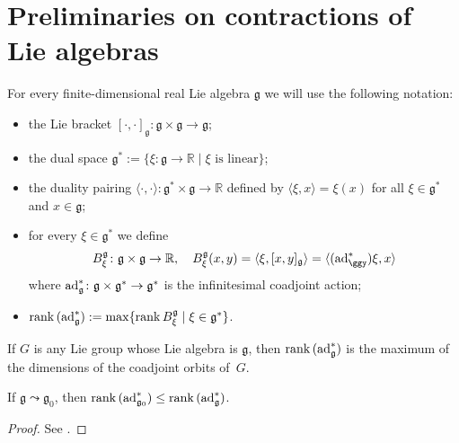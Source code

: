 \documentclass[
reqno]{amsart}
\begin{document}
\section{Preliminaries on contractions of Lie algebras}\label{Sect3}

\begin{notation}
\normalfont 
For every finite-dimensional real Lie algebra ${{\mathfrak g}}$ we will use the following notation: 
\begin{itemize}
\item the Lie bracket $[\cdot,\cdot]_{{\mathfrak g}}\colon{{\mathfrak g}}\times{{\mathfrak g}}\to{{\mathfrak g}}$; 
\item the dual space ${{\mathfrak g}}^*:=\{\xi\colon{{\mathfrak g}}\to{{\mathbb R}}\mid\xi\text{ is linear}\}$; 
\item the duality pairing 
$\langle\cdot,\cdot\rangle\colon{{\mathfrak g}}^*\times{{\mathfrak g}}\to{{\mathbb R}}$
defined by $\langle\xi,x\rangle=\xi(x)$ for all $\xi\in{{\mathfrak g}}^*$ and $x\in{{\mathfrak g}}$; 
\item for every $\xi\in{{\mathfrak g}}^*$ we define 
$$B^{{\mathfrak g}}_\xi\colon{{\mathfrak g}}\times{{\mathfrak g}}\to{{\mathbb R}}, \quad B^{{\mathfrak g}}_\xi(x,y)=\langle\xi,[x,y]_{{\mathfrak g}}\rangle=\langle({{\rm ad}}^*_\ggy)\xi,x\rangle$$ 
where ${{\rm ad}}^*_{{\mathfrak g}}\colon{{\mathfrak g}}\times{{\mathfrak g}}^*\to{{\mathfrak g}}^*$ is the infinitesimal coadjoint action;
\item ${{\rm rank}\,}({{\rm ad}}^*_{{\mathfrak g}}):=\max\{{{\rm rank}\,}  B^{{\mathfrak g}}_\xi\mid\xi\in{{\mathfrak g}}^*\}$.  
\end{itemize}
\end{notation}

\begin{remark}
\normalfont 
If $G$ is any Lie group whose Lie algebra is ${{\mathfrak g}}$, then ${{\rm rank}\,}({{\rm ad}}^*_{{\mathfrak g}})$ 
is the maximum of the dimensions of the coadjoint orbits of~$G$. 
\end{remark}

\begin{lemma}\label{NP}
If  ${{\mathfrak g}}{\leadsto}{{\mathfrak g}}_0$, 
then ${{\rm rank}\,}({{\rm ad}}^*_{{{\mathfrak g}}_0})\le{{\rm rank}\,}({{\rm ad}}^*_{{\mathfrak g}})$. 
\end{lemma}

\begin{proof}
See \cite[Th. 1(10)]{NP06}. 
\end{proof}
\end{document}
